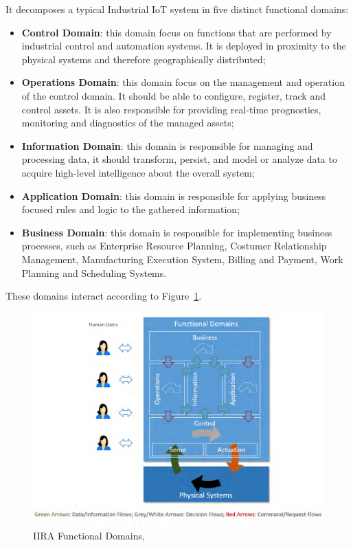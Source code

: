 It decomposes a typical Industrial \gls{IoT} system in five distinct functional domains:

\begin{itemize}
    \item \textbf{Control Domain}: this domain focus on functions that are performed by industrial control and automation systems. It is deployed in proximity to the physical systems and therefore geographically distributed;
    \item \textbf{Operations Domain}: this domain focus on the management and operation of the control domain. It should be able to configure, register, track and control assets. It is also responsible for providing real-time prognostics, monitoring and diagnostics of the managed assets;
    \item \textbf{Information Domain}: this domain is responsible for managing and processing data, it should transform, persist, and model or analyze data to acquire high-level intelligence about the overall system;
    \item \textbf{Application Domain}: this domain is responsible for applying business focused rules and logic to the gathered information;
    \item \textbf{Business Domain}: this domain is responsible for implementing business processes, such as Enterprise Resource Planning, Costumer Relationship Management, Manufacturing Execution System, Billing and Payment, Work Planning and Scheduling Systems. 
\end{itemize}

These domains interact according to Figure~\ref{fig:stateofart:arch:iira:domains}.

\begin{figure}[H]
    \centering
    \includegraphics[scale=0.5]{assets/figures/irra-domains.png}
    \caption[\gls{IIRA} Functional Domains]{\gls{IIRA} Functional Domains, \cite{iira}}
    \label{fig:stateofart:arch:iira:domains}
\end{figure}

